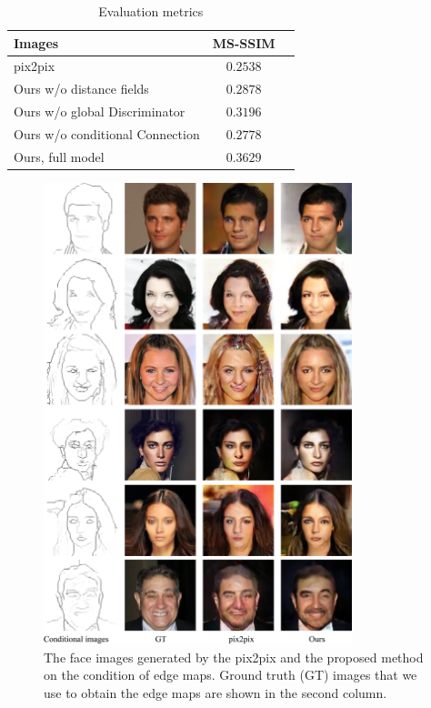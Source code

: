 %
%
\begin{table}[h]
	\centering	
	\caption{Evaluation metrics }
	\begin{tabular}{|l|c|c|}\hline
		Images & MS-SSIM \\\hline
		pix2pix \cite{pix2pix} & $0.2538$  \\
		Ours w/o distance fields & $0.2878$ \\
		Ours w/o global Discriminator & $0.3196$  \\
		Ours w/o conditional Connection & $0.2778$ \\
		Ours, full model  & $\mathbf{0.3629}$ \\\hline
	\end{tabular}
	\label{tab:evaluation_metrics}
\end{table}
%
%
\begin{figure}
	\includegraphics[width=0.8\textwidth]{figures/results}
	\caption{The face images generated by the pix2pix and the proposed method on the condition of edge maps. Ground truth (GT) images that we use to obtain the edge maps are shown in the second column. }
	\label{fig:results}
\end{figure}
%
%
